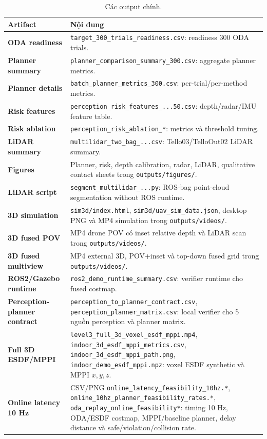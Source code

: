 \documentclass[10pt,a4paper]{article}
\newcommand{\code}[1]{\texttt{#1}}
\begin{document}
\begin{table}[H]
\centering
\small
\caption{Các output chính.}
\begin{tabularx}{0.98\linewidth}{>{\bfseries}p{3.8cm} X}
\toprule
Artifact & Nội dung \\
\midrule
ODA readiness & \code{target\_300\_trials\_readiness.csv}: readiness 300 ODA trials. \\
Planner summary & \code{planner\_comparison\_summary\_300.csv}: aggregate planner metrics. \\
Planner details & \code{batch\_planner\_metrics\_300.csv}: per-trial/per-method metrics. \\
Risk features & \code{perception\_risk\_features\_...50.csv}: depth/radar/IMU feature table. \\
Risk ablation & \code{perception\_risk\_ablation\_*}: metrics và threshold tuning. \\
LiDAR summary & \code{multilidar\_two\_bag\_...csv}: Tello03/TelloOut02 LiDAR summary. \\
Figures & Planner, risk, depth calibration, radar, LiDAR, qualitative contact sheets trong \code{outputs/figures/}. \\
LiDAR script & \code{segment\_multilidar\_...py}: ROS-bag point-cloud segmentation without ROS runtime. \\
3D simulation & \code{sim3d/index.html}, \code{sim3d/uav\_sim\_data.json}, desktop PNG và MP4 simulation trong \code{outputs/videos/}. \\
3D fused POV & MP4 drone POV có inset relative depth và LiDAR scan trong \code{outputs/videos/}. \\
3D fused multiview & MP4 external 3D, POV+inset và top-down fused grid trong \code{outputs/videos/}. \\
ROS2/Gazebo runtime & \code{ros2\_demo\_runtime\_summary.csv}: verifier runtime cho fused costmap. \\
Perception-planner contract & \code{perception\_to\_planner\_contract.csv}, \code{perception\_planner\_matrix.csv}: local verifier cho 5 nguồn perception và planner matrix. \\
Full 3D ESDF/MPPI & \code{level3\_full\_3d\_voxel\_esdf\_mppi.mp4}, \code{indoor\_3d\_esdf\_mppi\_metrics.csv}, \code{indoor\_3d\_esdf\_mppi\_path.png}, \code{indoor\_demo\_esdf\_mppi.npz}: voxel ESDF synthetic và MPPI \(x,y,z\). \\
Online latency 10 Hz & CSV/PNG \code{online\_latency\_feasibility\_10hz.*}, \code{online\_10hz\_planner\_feasibility\_rates.*}, \code{oda\_replay\_online\_feasibility*}: timing 10 Hz, ODA/ESDF costmap, MPPI/baseline planner, delay distance và safe/violation/collision rate. \\

\end{tabularx}
\end{table}
\end{document}
